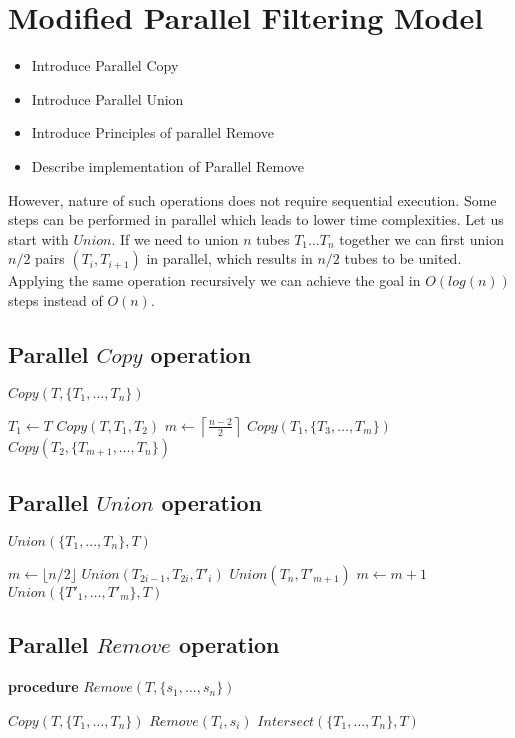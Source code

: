 \section{Modified Parallel Filtering Model}\label{mpfm}
\begin{itemize}
	\item Introduce Parallel Copy
	\item Introduce Parallel Union
	\item Introduce Principles of parallel Remove
	\item Describe implementation of Parallel Remove
\end{itemize}

However, nature of such operations does not require sequential execution. Some steps can be performed in parallel which leads to lower time complexities.
Let us start with $Union$. If we need to union $n$ tubes $T_1...T_n$ together we can first union $n/2$ pairs $(T_i, T_{i+1})$ in parallel, which results in $n/2$ tubes to be united. Applying the same operation recursively we can achieve the goal in $O(log(n))$ steps instead of $O(n)$.

\subsection{Parallel $Copy$ operation}
\PROCEDURE $Copy(T, \{T_1, ..., T_n\})$
\begin{algorithmic}[1]
	  \STATE $T_1 \gets T$
	  \STATE $Copy(T, T_1, T_2)$
      \STATE $m \gets \left\lceil\frac{n-2}{2}\right\rceil$
  	  \INPARALLELDO
	      \PSTATE $Copy(T_1, \{T_3, \dots, T_m\})$	
	      \PSTATE $Copy(T_2, \{T_{m+1}, \dots, T_n\})$	
	    \ENDINPARALLELDO
  	\ENDIF
	\ENDIF
\end{algorithmic}

\subsection{Parallel $Union$ operation}
\PROCEDURE $Union(\{T_1, ..., T_n\}, T)$
\begin{algorithmic}[1]
	\STATE $m \gets \lfloor n/2 \rfloor$
  	\STATE $Union(T_{2i-1}, T_{2i}, T'_i)$
  \ENDFOR
    \STATE $Union(T_n, T'_{m+1}) $
    \STATE $m \gets m+1$
  \ENDIF
  \STATE $Union(\{T'_1, \dots, T'_m\}, T)$
\end{algorithmic}

\subsection{Parallel $Remove$ operation}
{\bf procedure} $Remove(T, \{s_1, \dots, s_n\})$
\begin{algorithmic}[1]
	\STATE $Copy(T, \{T_1, \dots, T_n\})$
  	\STATE $Remove(T_i, s_i)$
  \ENDFOR
  \STATE $Intersect(\{T_1, \dots, T_n\}, T)$
\end{algorithmic}

